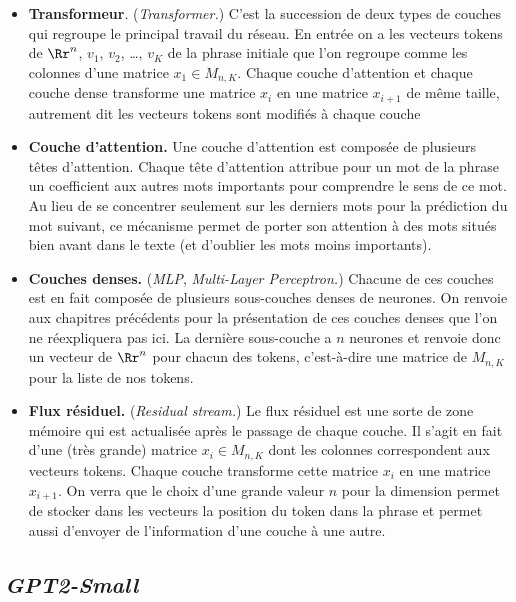 \documentclass[11pt,class=report,crop=false]{standalone}
\begin{document}
\begin{itemize}
	\item \textbf{Transformeur}. (\emph{Transformer.}) C'est la succession de deux types de couches qui regroupe le principal travail du réseau.
	En entrée on a les vecteurs tokens de $\Rr^n$, $v_1$, $v_2$, \ldots, $v_K$ de la phrase initiale que l'on regroupe comme les colonnes d'une matrice $x_1 \in M_{n,K}$. Chaque couche d'attention et chaque couche dense transforme 
	une matrice $x_i$ en une matrice $x_{i+1}$ de même taille, autrement dit les vecteurs tokens sont modifiés à chaque couche
	
	\item \textbf{Couche d'attention.} Une couche d'attention est composée de plusieurs têtes d'attention. Chaque tête d'attention attribue pour un mot de la phrase un coefficient aux autres mots importants pour comprendre le sens de ce mot. Au lieu de se concentrer seulement sur les derniers mots pour la prédiction du mot suivant, ce mécanisme permet de porter son attention à des mots situés bien avant dans le texte (et d'oublier les mots moins importants).
	
	\item \textbf{Couches denses.} (\emph{MLP}, \emph{Multi-Layer Perceptron.}) Chacune de ces couches est en fait composée de plusieurs sous-couches denses de neurones. On renvoie aux chapitres précédents pour la présentation de ces couches denses que l'on ne réexpliquera pas ici. La dernière sous-couche a $n$ neurones et renvoie donc un vecteur de $\Rr^n$ pour chacun des tokens, c'est-à-dire une matrice de $M_{n,K}$ pour la liste de nos tokens.
	
	\item \textbf{Flux résiduel.} (\emph{Residual stream.})
	Le flux résiduel est une sorte de zone mémoire qui est actualisée après le passage de chaque couche. Il s'agit en fait d'une (très grande) matrice $x_i \in M_{n,K}$ dont les colonnes correspondent aux vecteurs tokens. Chaque couche transforme cette matrice $x_i$ en une matrice $x_{i+1}$. On verra que le choix d'une grande valeur $n$ pour la  dimension permet de stocker dans les vecteurs la position du token dans la phrase et permet aussi d'envoyer de l'information d'une couche à une autre.
	
\end{itemize}

\subsection{\emph{GPT2-Small}}
\end{document}

